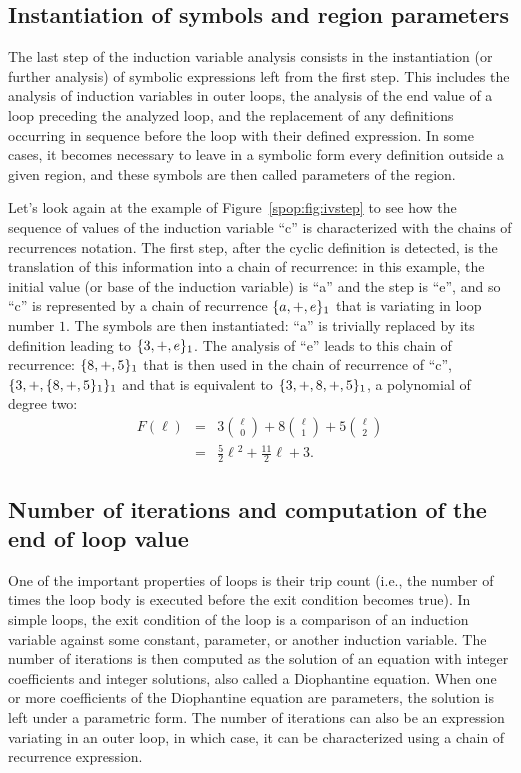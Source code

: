 \subsection{Instantiation of symbols and region parameters}

The last step of the induction variable analysis consists in the
instantiation (or further analysis) of symbolic expressions left from
the first step.  This includes the analysis of induction variables in
outer loops, the analysis of the end value of a loop preceding the
analyzed loop, and the replacement of any definitions occurring in
sequence before the loop with their defined expression.  In some
cases, it becomes necessary to leave in a symbolic form every
definition outside a given region, and these symbols are then called
parameters of the region.

Let's look again at the example of Figure~\ref{spop:fig:ivstep} to see
how the sequence of values of the induction variable ``c'' is
characterized with the chains of recurrences notation.  The first
step, after the cyclic definition is detected, is the translation of
this information into a chain of recurrence: in this example, the
initial value (or base of the induction variable) is ``a'' and the
step is ``e'', and so ``c'' is represented by a chain of recurrence
$\{a, +, e\}_1$ that is variating in loop number $1$.  The symbols
are then instantiated: ``a'' is trivially replaced by its definition
leading to $\{3, +, e\}_1$.  The analysis of ``e'' leads to this
chain of recurrence: $\{8, +, 5\}_1$ that is then used in the
chain of recurrence of ``c'', $\{3, +, \{8, +, 5\}_1\}_1$ and
that is equivalent to $\{3, +, 8, +, 5\}_1$, a polynomial of
degree two:
\begin{eqnarray*}
  F(\ell)
  &=& 3\binom{\ell}{0} + 8\binom{\ell}{1} + 5\binom{\ell}{2} \\
  &=& \frac{5}{2}\ell{}^2+\frac{11}{2}\ell + 3.
\end{eqnarray*}

\subsection{Number of iterations and computation of the end of loop value}

One of the important properties of loops is their trip count (i.e.,
the number of times the loop body is executed before the exit
condition becomes true).  In simple loops, the exit condition of the
loop is a comparison of an induction variable against some constant,
parameter, or another induction variable.  The number of iterations is
then computed as the solution of an equation with integer coefficients
and integer solutions, also called a Diophantine equation.  When one
or more coefficients of the Diophantine equation are parameters, the
solution is left under a parametric form.  The number of iterations
can also be an expression variating in an outer loop, in which case,
it can be characterized using a chain of recurrence expression.


